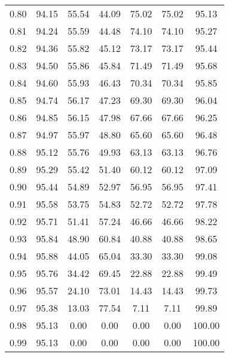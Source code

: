 \begin{tabular}{|c|c|c|c|c|c|c|}
      0.80 &     94.15 &     55.54 &      44.09 &   75.02 &      75.02 &         95.13 \\
      0.81 &     94.24 &     55.59 &      44.48 &   74.10 &      74.10 &         95.27 \\
      0.82 &     94.36 &     55.82 &      45.12 &   73.17 &      73.17 &         95.44 \\
      0.83 &     94.50 &     55.86 &      45.84 &   71.49 &      71.49 &         95.68 \\
      0.84 &     94.60 &     55.93 &      46.43 &   70.34 &      70.34 &         95.85 \\
      0.85 &     94.74 &     56.17 &      47.23 &   69.30 &      69.30 &         96.04 \\
      0.86 &     94.85 &     56.15 &      47.98 &   67.66 &      67.66 &         96.25 \\
      0.87 &     94.97 &     55.97 &      48.80 &   65.60 &      65.60 &         96.48 \\
      0.88 &     95.12 &     55.76 &      49.93 &   63.13 &      63.13 &         96.76 \\
      0.89 &     95.29 &     55.42 &      51.40 &   60.12 &      60.12 &         97.09 \\
      0.90 &     95.44 &     54.89 &      52.97 &   56.95 &      56.95 &         97.41 \\
      0.91 &     95.58 &     53.75 &      54.83 &   52.72 &      52.72 &         97.78 \\
      0.92 &     95.71 &     51.41 &      57.24 &   46.66 &      46.66 &         98.22 \\
      0.93 &     95.84 &     48.90 &      60.84 &   40.88 &      40.88 &         98.65 \\
      0.94 &     95.88 &     44.05 &      65.04 &   33.30 &      33.30 &         99.08 \\
      0.95 &     95.76 &     34.42 &      69.45 &   22.88 &      22.88 &         99.49 \\
      0.96 &     95.57 &     24.10 &      73.01 &   14.43 &      14.43 &         99.73 \\
      0.97 &     95.38 &     13.03 &      77.54 &    7.11 &       7.11 &         99.89 \\
      0.98 &     95.13 &      0.00 &       0.00 &    0.00 &       0.00 &        100.00 \\
      0.99 &     95.13 &      0.00 &       0.00 &    0.00 &       0.00 &        100.00 \\
\bottomrule
\end{tabular}
